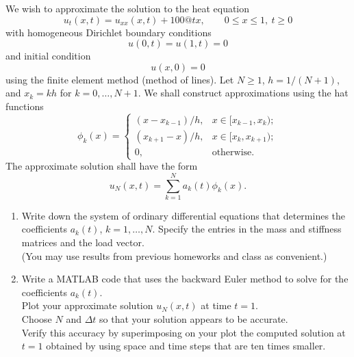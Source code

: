 We wish to approximate the solution to the heat equation 
\[ u_t(x,t) =  u_{xx}(x,t) + 100@t x, \qquad 0\le x \le 1,\ t\ge 0\]
with homogeneous Dirichlet boundary conditions
\[ u(0,t) = u(1,t) = 0\]
and initial condition
\[ u(x,0) = 0\]
using the finite element method (method of lines).
Let $N\ge 1$,  $h = 1/(N+1)$,  and $x_k = kh$ for $k = 0, \ldots, N+1$.
We shall construct approximations using the hat functions
\[ \phi_k(x) = \left\{ \begin{array}{ll}
           (x-x_{k-1})/h, & x\in [x_{k-1}, x_k);\\
           (x_{k+1}-x)/h, & x\in [x_k, x_{k+1});\\
            0,             & \mbox{otherwise}.
          \end{array}\right. \]
The approximate solution shall have the form
\[ u_N(x,t) = \sum_{k=1}^N a_k(t) \phi_k(x).\]

\begin{enumerate}
\item Write down the system of ordinary differential equations that determines
      the coefficients $a_k(t)$, $k=1,\ldots, N$.  Specify the
      entries in the mass and stiffness matrices and the load vector.\\
      (You may use results from previous homeworks and class as convenient.)

\item Write a MATLAB code that uses the backward Euler method
      to solve for the coefficients $a_k(t)$.\\
      Plot your approximate solution $u_N(x,t)$ at time $t = 1$.\\
      Choose $N$ and $\Delta t$ so that your solution appears to be accurate.\\
      Verify this accuracy by superimposing on your plot the computed
      solution at $t=1$ obtained by using space and time steps that are ten times smaller.

\end{enumerate}



